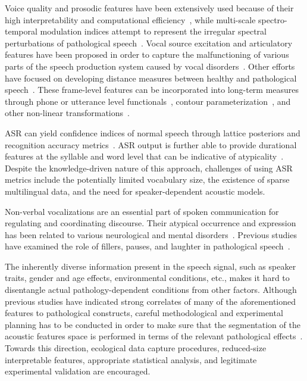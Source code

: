 \documentclass{article}
\begin{document}
Voice quality and prosodic features have been extensively used because of their high interpretability and computational efficiency~\cite{van2010computational,tsanas2012novel,bone2014psychologist}, while multi-scale spectro-temporal modulation indices attempt to represent the irregular spectral perturbations of pathological speech~\cite{liss2010discriminating,falk2012characterization,williamson2015automatic}. Vocal source excitation and articulatory features have been proposed in order to capture the malfunctioning of various parts of the speech production system caused by vocal disorders~\cite{falk2012characterization,hahm2015parkinson}. Other efforts have focused on developing distance measures between healthy and pathological speech~\cite{gu2005disordered}. These frame-level features can be incorporated into long-term measures through phone or utterance level functionals~\cite{kim2015automatic}, contour parameterization~\cite{kim2015automatic2}, and other non-linear transformations~\cite{kim2015automatic,an2015automatic,middag2011combining}.

ASR can yield confidence indices of normal speech through lattice posteriors and recognition accuracy metrics~\cite{kim2015automatic,zlotnik2015random,maier2009peaks,sharma2009universal,middag2009automated}. ASR output is further able to provide durational features at the syllable and word level that can be indicative of atypicality~\cite{an2015automatic,duez2006consonant}. Despite the knowledge-driven nature of this approach, challenges of using ASR metrics include the potentially limited vocabulary size, the existence of sparse multilingual data, and the need for speaker-dependent acoustic models.

Non-verbal vocalizations are an essential part of spoken communication for regulating and coordinating discourse. Their atypical occurrence and expression has been related to various neurological and mental disorders~\cite{lake2011listener}. Previous studies have examined the role of fillers, pauses, and laughter in pathological speech~\cite{heeman2010autism,lake2011listener,gupta2014predicting}.

The inherently diverse information present in the speech signal, such as speaker traits, gender and age effects, environmental conditions, etc., makes it hard to disentangle actual pathology-dependent conditions from other factors. Although previous studies have indicated strong correlates of many of the aforementioned features to pathological constructs, careful methodological and experimental planning has to be conducted in order to make sure that the segmentation of the acoustic features space is performed in terms of the relevant pathological effects~\cite{bone2013classifying}. Towards this direction, ecological data capture procedures, reduced-size interpretable features, appropriate statistical analysis, and legitimate experimental validation are encouraged.
\end{document}

